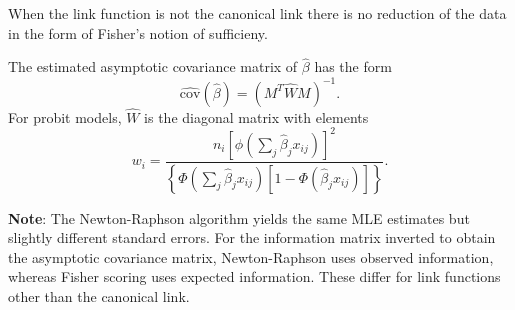 \documentclass[
  ignorenonframetext,
]{beamer}
\begin{document}
\begin{frame}{}
\protect\hypertarget{section-10}{}
When the link function is not the canonical link there is no reduction
of the data in the form of Fisher's notion of sufficieny.

\vspace{12pt}

The estimated asymptotic covariance matrix of \(\hat\beta\) has the form
\[
  \widehat{\text{cov}}(\hat\beta) = \left(M^T\widehat{W}M\right)^{-1}.
\] For probit models, \(\widehat{W}\) is the diagonal matrix with
elements \[
  w_i =\frac{n_i\left[\phi\left(\sum_j\hat\beta_j x_{ij}\right)\right]^2}
  {\left\{\Phi\left(\sum_j\hat\beta_j x_{ij}\right)\left[1 - \Phi\left(\hat\beta_j x_{ij}\right)\right]\right\}}.
\]

\vspace{12pt}

\textbf{Note}: The Newton-Raphson algorithm yields the same MLE
estimates but slightly different standard errors. For the information
matrix inverted to obtain the asymptotic covariance matrix,
Newton-Raphson uses observed information, whereas Fisher scoring uses
expected information. These differ for link functions other than the
canonical link.
\end{frame}
\end{document}
